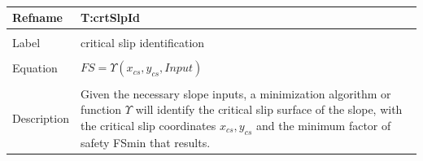 \documentclass[12pt]{article}
\begin{document}
~\newline
\noindent \begin{minipage}{\textwidth}
\begin{tabular}{p{} p{}}
\toprule \textbf{Refname} & \textbf{T:crtSlpId}
\label{T:crtSlpId}
\\ \midrule \\
Label & critical slip identification
\\ \midrule \\
Equation & $FS=\Upsilon{}({x_{cs},y_{cs}},Input)$
\\ \midrule \\
Description & Given the necessary slope inputs, a minimization algorithm or function $\Upsilon{}$ will identify the critical slip surface of the slope, with the critical slip coordinates ${x_{cs},y_{cs}}$ and the minimum factor of safety FSmin that results.
\\ \bottomrule \end{tabular}
\end{minipage}\\
\end{document}

